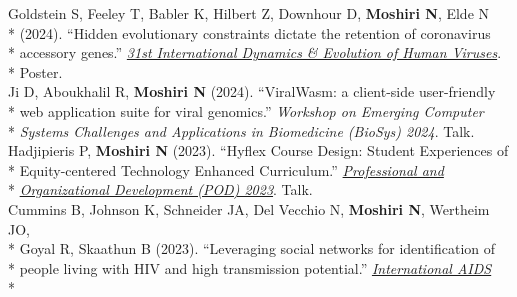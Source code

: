 \documentclass[margin,line]{res}
\begin{document}
\begin{resume}
\hspace*{4mm} Goldstein S, Feeley T, Babler K, Hilbert Z, Downhour D, \textbf{Moshiri N}, Elde N\\*
\hspace*{9.5mm} (2024). ``Hidden evolutionary constraints dictate the retention of coronavirus\\*
\hspace*{9.5mm} accessory genes.'' \href{https://cpd.ucsd.edu/hivdynamics/}{\textit{31st International Dynamics \& Evolution of Human Viruses}}.\\*\vspace{2mm}
\hspace*{8mm} Poster.\\
\hspace*{4mm} Ji D, Aboukhalil R, \textbf{Moshiri N} (2024). ``ViralWasm: a client-side user-friendly\\*
\hspace*{9.5mm} web application suite for viral genomics.'' \textit{Workshop on Emerging Computer}\\*\vspace{2mm}
\hspace*{8mm} \textit{Systems Challenges and Applications in Biomedicine (BioSys) 2024}. Talk.\\
\hspace*{4mm} Hadjipieris P, \textbf{Moshiri N} (2023). ``Hyflex Course Design: Student Experiences of\\*
\hspace*{9.5mm} Equity-centered Technology Enhanced Curriculum.'' \href{https://podnetwork.org/48th-annual-conference/}{\textit{Professional and}}\\*\vspace{2mm}
\hspace*{8mm} \href{https://podnetwork.org/48th-annual-conference/}{\textit{Organizational Development (POD) 2023}}. Talk.\\
\hspace*{4mm} Cummins B, Johnson K, Schneider JA, Del Vecchio N, \textbf{Moshiri N}, Wertheim JO,\\*
\hspace*{9.5mm} Goyal R, Skaathun B (2023). ``Leveraging social networks for identification of\\*
\hspace*{9.5mm} people living with HIV and high transmission potential.'' \href{https://www.iasociety.org/conferences/ias2023}{\textit{International AIDS}}\\*\vspace{2mm}

\end{resume}
\end{document}
